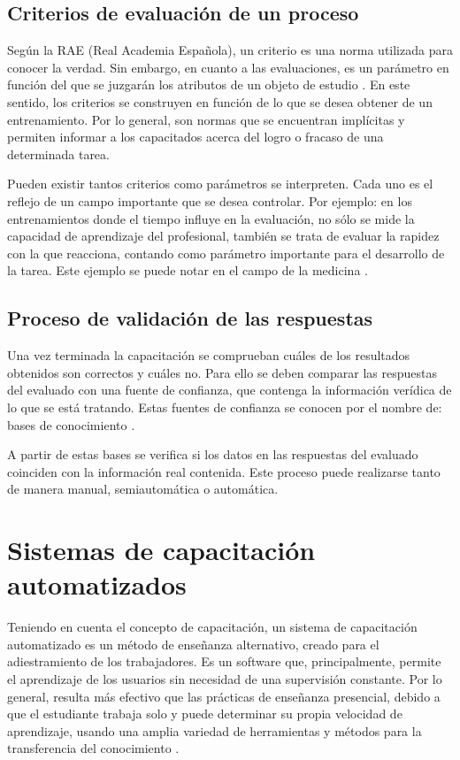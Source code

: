 \subsection{Criterios de evaluación de un proceso}
Según la RAE (Real Academia Española), un criterio es una norma utilizada para conocer la verdad. Sin embargo, en cuanto a las evaluaciones, es un parámetro en función del que se juzgarán los atributos de un objeto de estudio \cite{RAE2022}. En este sentido, los criterios se construyen en función de lo que se desea obtener de un entrenamiento. Por lo general, son normas que se encuentran implícitas y permiten informar a los capacitados acerca del logro o fracaso de una determinada tarea. 

Pueden existir tantos criterios como parámetros se interpreten. Cada uno es el reflejo de un campo importante que se desea controlar. Por ejemplo: en los entrenamientos donde el tiempo influye en la evaluación, no sólo se mide la capacidad de aprendizaje del profesional, también se trata de evaluar la rapidez con la que reacciona, contando como parámetro importante para el desarrollo de la tarea. Este ejemplo se puede notar en el campo de la medicina \cite{Castrillon2021}.

\subsection{Proceso de validación de las respuestas}
Una vez terminada la capacitación se comprueban cuáles de los resultados obtenidos son correctos y cuáles no. Para ello se deben comparar las respuestas del evaluado con una fuente de confianza, que contenga la información verídica de lo que se está tratando. Estas fuentes de confianza se conocen por el nombre de: bases de conocimiento \cite{Rasheed2021}.

A partir de estas bases se verifica si los datos en las respuestas del evaluado coinciden con la información real contenida. Este proceso puede realizarse tanto de manera manual, semiautomática o automática.

\section{Sistemas de capacitación automatizados}
Teniendo en cuenta el concepto de capacitación, un sistema de capacitación automatizado es un método de enseñanza alternativo, creado para el adiestramiento de los trabajadores. Es un software que, principalmente, permite el aprendizaje de los usuarios sin necesidad de una supervisión constante. Por lo general, resulta más efectivo que las prácticas de enseñanza presencial, debido a que el estudiante trabaja solo y puede determinar su propia velocidad de aprendizaje, usando una amplia variedad de herramientas y métodos para la transferencia del conocimiento \cite{ISEM2022}.

